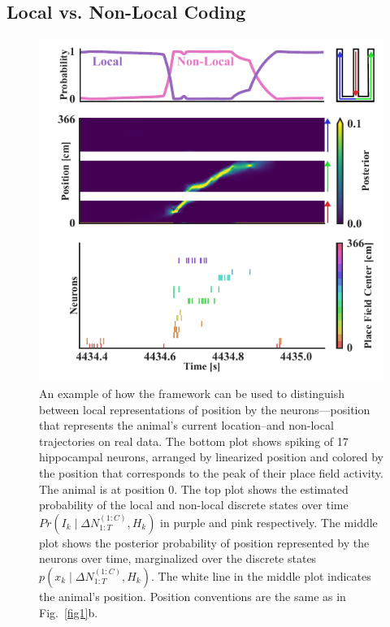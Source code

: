 \documentclass[conference]{IEEEtran}
\begin{document}
\subsection{Local vs. Non-Local Coding}
\begin{figure}[ht]
\centerline{\includegraphics{fig2.pdf}}
\caption{An example of how the framework can be used to distinguish between local representations of position by the neurons---position that represents the animal's current location--and non-local trajectories on real data. The bottom plot shows spiking of 17 hippocampal neurons, arranged by linearized position and colored by the position that corresponds to the peak of their place field activity. The animal is at position 0. The top plot shows the estimated probability of the local and non-local discrete states over time $Pr(I_{k} \mid \Delta N_{1:T}^{(1:C)}, H_{k})$ in purple and pink respectively. The middle plot shows the posterior probability of position represented by the neurons over time, marginalized over the discrete states $p(x_{k} \mid \Delta N_{1:T}^{(1:C)}, H_{k})$. The white line in the middle plot indicates the animal's position. Position conventions are the same as in Fig.~\ref{fig1}b.}
\label{fig2}
\end{figure}
\end{document}
